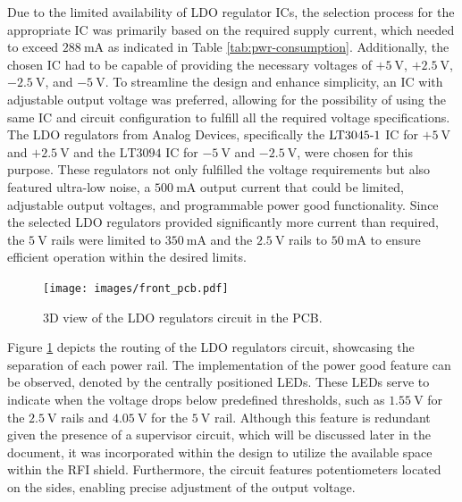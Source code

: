 Due to the limited availability of \ac{LDO} regulator \ac{IC}s, the selection process for the appropriate \ac{IC} was primarily based on the required supply current, which needed to exceed $\mathrm{288~mA}$ as indicated in Table \ref{tab:pwr-consumption}. Additionally, the chosen \ac{IC} had to be capable of providing the necessary voltages of $\mathrm{+5~V}$, $\mathrm{+2.5~V}$, $\mathrm{-2.5~V}$, and $\mathrm{-5~V}$. To streamline the design and enhance simplicity, an \ac{IC} with adjustable output voltage was preferred, allowing for the possibility of using the same \ac{IC} and circuit configuration to fulfill all the required voltage specifications. The \ac{LDO} regulators from Analog Devices, specifically the $\mathrm{LT3045\textnormal{-}1}$ \ac{IC} for $\mathrm{+5~V}$ and $\mathrm{+2.5~V}$ and the $\mathrm{LT3094}$ \ac{IC} for $\mathrm{-5~V}$ and $\mathrm{-2.5~V}$, were chosen for this purpose. These regulators not only fulfilled the voltage requirements but also featured ultra-low noise, a $\mathrm{500~mA}$ output current that could be limited, adjustable output voltages, and programmable power good functionality. Since the selected \ac{LDO} regulators provided significantly more current than required, the $\mathrm{5~V}$ rails were limited to $\mathrm{350~mA}$ and the $\mathrm{2.5~V}$ rails to $\mathrm{50~mA}$ to ensure efficient operation within the desired limits.

\begin{figure}[!ht]
    \centering
    \texttt{[image: images/front\_pcb.pdf]}
    \caption{3D view of the LDO regulators circuit in the PCB.}
    \label{figure:ldo-pcb}
\end{figure}

Figure \ref{figure:ldo-pcb} depicts the routing of the \ac{LDO} regulators circuit, showcasing the separation of each power rail. The implementation of the power good feature can be observed, denoted by the centrally positioned \ac{LED}s. These \ac{LED}s serve to indicate when the voltage drops below predefined thresholds, such as $\mathrm{1.55~V}$ for the $\mathrm{2.5~V}$ rails and $\mathrm{4.05~V}$ for the $\mathrm{5~V}$ rail. Although this feature is redundant given the presence of a supervisor circuit, which will be discussed later in the document, it was incorporated within the design to utilize the available space within the \ac{RFI} shield. Furthermore, the circuit features potentiometers located on the sides, enabling precise adjustment of the output voltage.

